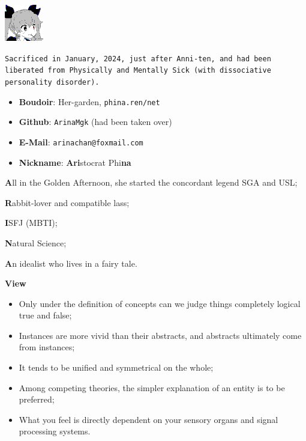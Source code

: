 
\includegraphics{../../../.picture/phina.head.bmp}


\verb|Sacrificed in January, 2024, just after Anni-ten, and had been liberated from Physically and Mentally Sick (with dissociative personality disorder). |

\begin{itemize}
	\item \textbf{Boudoir}: Her-garden, \texttt{phina.ren/net}
	\item \textbf{Github}: \verb|ArinaMgk| (had been taken over)
	\item \textbf{E-Mail}: \verb|arinachan@foxmail.com|
	\item \textbf{Nickname}: \textbf{Ari}stocrat Phi\textbf{na}
\end{itemize}


\textbf{A}ll in the Golden Afternoon\cite{AliceWonderland}, she started the concordant legend \textemdash{} SGA and USL;

\textbf{R}abbit-lover and compatible lass;

\textbf{I}SFJ (MBTI);

\textbf{N}atural Science;

\textbf{A}n idealist who lives in a fairy tale.

\textbf{View}
\begin{itemize}
	\item Only under the definition of concepts can we judge things completely logical true and false;
	\item Instances are more vivid than their abstracts, and abstracts ultimately come from instances;
	\item It tends to be unified and symmetrical on the whole;
	\item Among competing theories, the simpler explanation of an entity is to be preferred;
	\item What you feel is directly dependent on your sensory organs and signal processing systems.
\end{itemize}

